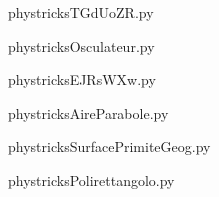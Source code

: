     \newcommand{\CaptionFigTGdUoZR}{<+Type your caption here+>}
    \begin{center}
        
    \end{center}
    phystricksTGdUoZR.py

    

    \clearpage
    


    \newcommand{\CaptionFigOsculateur}{<+Type your caption here+>}
    \begin{center}
        
    \end{center}
    phystricksOsculateur.py

    

    \clearpage
    


    \newcommand{\CaptionFigEJRsWXw}{<+Type your caption here+>}
    \begin{center}
        
    \end{center}
    phystricksEJRsWXw.py

    

    \clearpage
    


    \newcommand{\CaptionFigAireParabole}{<+Type your caption here+>}
    \begin{center}
        
    \end{center}
    phystricksAireParabole.py

    

    \clearpage
    


    \newcommand{\CaptionFigSurfacePrimiteGeog}{<+Type your caption here+>}
    \begin{center}
        
    \end{center}
    phystricksSurfacePrimiteGeog.py

    

    \clearpage
    


    \newcommand{\CaptionFigPolirettangolo}{<+Type your caption here+>}
    \begin{center}
        
    \end{center}
    phystricksPolirettangolo.py

